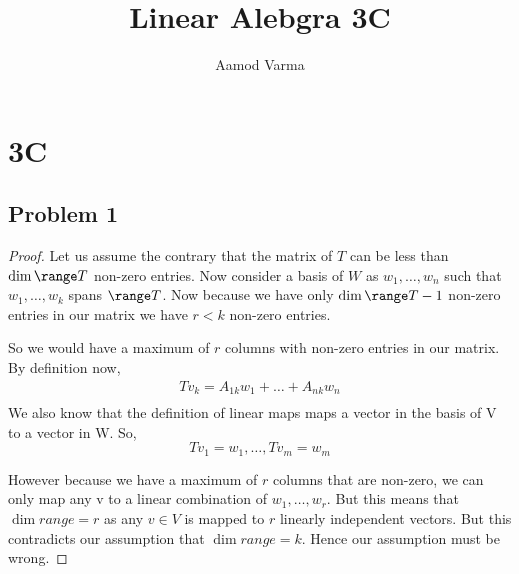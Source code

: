 \documentclass[a4paper]{report}
\title{Linear Alebgra 3C}
\author{Aamod Varma}
\begin{document}
\maketitle
\date{}

\section*{3C}
\subsection*{Problem 1}
\begin{proof}
    Let us assume the contrary that the matrix of $T$ can be less than $\dim \range T$ non-zero entries. Now consider a basis of $W$ as $w_1,\dots,w_n$ such that $w_1,\dots,w_k$ spans $\range T$. Now because we have only $\dim \range T - 1$ non-zero entries in our matrix we have $r < k$ non-zero entries.

    So we would have a maximum of $r$ columns with non-zero entries in our matrix. By definition now, 
    \begin{align*}
        Tv_k = A_{1k}w_1 + \dots + A_{nk}w_n\\
    \end{align*}
    We also know that the definition of linear maps maps a vector in the basis of V to a vector in W. So,
    $$ Tv_1 = w_1 ,\dots,Tv_m = w_m$$ 

    However because we have a maximum of $r$ columns that are non-zero, we can only map  any v to a linear combination of $w_1,\dots,w_r$. But this means that $\dim range = r$ as any $v \in V$ is mapped to $r$ linearly independent vectors. But this contradicts our assumption that $\dim range = k$. Hence our assumption must be wrong.
\end{proof}
\end{document}
